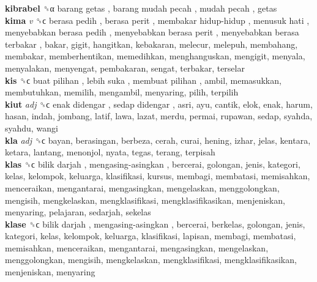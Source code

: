 \textbf{kibrabel} ␝α   barang getas ,  barang mudah pecah ,  mudah pecah , getas  \\
\textbf{kima} \emph{v}  ␝ϲ   berasa pedih ,  berasa perit ,  membakar hidup-hidup ,  menusuk hati ,  menyebabkan berasa pedih ,  menyebabkan berasa perit ,  menyebabkan berasa terbakar , bakar, gigit, hangitkan, kebakaran, melecur, melepuh, membahang, membakar, memberhentikan, memedihkan, menghanguskan, mengigit, menyala, menyalakan, menyengat, pembakaran, sengat, terbakar, terselar  \\
\textbf{kis} ␝ϲ   buat pilihan ,  lebih suka ,  membuat pilihan , ambil, memasukkan, membutuhkan, memilih, mengambil, menyaring, pilih, terpilih  \\
\textbf{kiut} \emph{adj}  ␝ϲ   enak didengar ,  sedap didengar , asri, ayu, cantik, elok, enak, harum, hasan, indah, jombang, latif, lawa, lazat, merdu, permai, rupawan, sedap, syahda, syahdu, wangi  \\
\textbf{kla} \emph{adj}  ␝ϲ  bayan, berasingan, berbeza, cerah, curai, hening, izhar, jelas, kentara, ketara, lantang, menonjol, nyata, tegas, terang, terpisah  \\
\textbf{klas} ␝ϲ   bilik darjah ,  mengasing-asingkan , bercerai, golongan, jenis, kategori, kelas, kelompok, keluarga, klasifikasi, kursus, membagi, membatasi, memisahkan, menceraikan, mengantarai, mengasingkan, mengelaskan, menggolongkan, mengisih, mengkelaskan, mengklasifikasi, mengklasifikasikan, menjeniskan, menyaring, pelajaran, sedarjah, sekelas  \\
\textbf{klase} ␝ϲ   bilik darjah ,  mengasing-asingkan , bercerai, berkelas, golongan, jenis, kategori, kelas, kelompok, keluarga, klasifikasi, lapisan, membagi, membatasi, memisahkan, menceraikan, mengantarai, mengasingkan, mengelaskan, menggolongkan, mengisih, mengkelaskan, mengklasifikasi, mengklasifikasikan, menjeniskan, menyaring  \\
